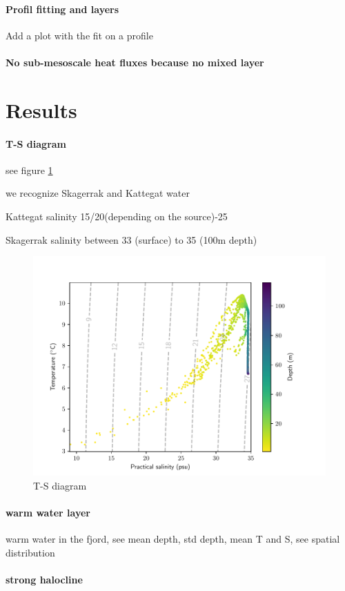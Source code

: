 \documentclass[12pt,a4paper]{article}
\begin{document}
\paragraph{Profil fitting and layers}
Add a plot with the fit on a profile
\paragraph{No sub-mesoscale heat fluxes because no mixed layer}

\section{Results}

\paragraph{T-S diagram}
see figure \ref{fig:ts}

we recognize Skagerrak and Kattegat water \citep{bjork2003,gustafsson1996}

Kattegat salinity 15/20(depending on the source)-25

Skagerrak salinity between 33 (surface) to 35 (100m depth)

\begin{figure}
  \centering
  \includegraphics[width=.7\textwidth]{ts_conv}
  \caption{\label{fig:ts}T-S diagram}
\end{figure}

\paragraph{warm water layer}
warm water in the fjord, see mean depth, std depth, mean T and S, see spatial
distribution

\paragraph{strong halocline}
\end{document}
